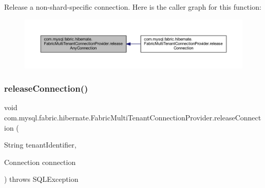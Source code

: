Release a non-\/shard-\/specific connection. Here is the caller graph for this function\+:\nopagebreak
\begin{figure}[H]
\begin{center}
\leavevmode
\includegraphics[width=350pt]{classcom_1_1mysql_1_1fabric_1_1hibernate_1_1_fabric_multi_tenant_connection_provider_a40292c72bd0ebf6f73e17f57fcc2ca38_icgraph}
\end{center}
\end{figure}
\mbox{\label{classcom_1_1mysql_1_1fabric_1_1hibernate_1_1_fabric_multi_tenant_connection_provider_a7d6f77f42ea4f2e0c4569fbf4d58689d}} 
\subsubsection{\texorpdfstring{release\+Connection()}{releaseConnection()}}
{\footnotesize\ttfamily void com.\+mysql.\+fabric.\+hibernate.\+Fabric\+Multi\+Tenant\+Connection\+Provider.\+release\+Connection (\begin{DoxyParamCaption}\item[{String}]{tenant\+Identifier,  }\item[{Connection}]{connection }\end{DoxyParamCaption}) throws S\+Q\+L\+Exception}

